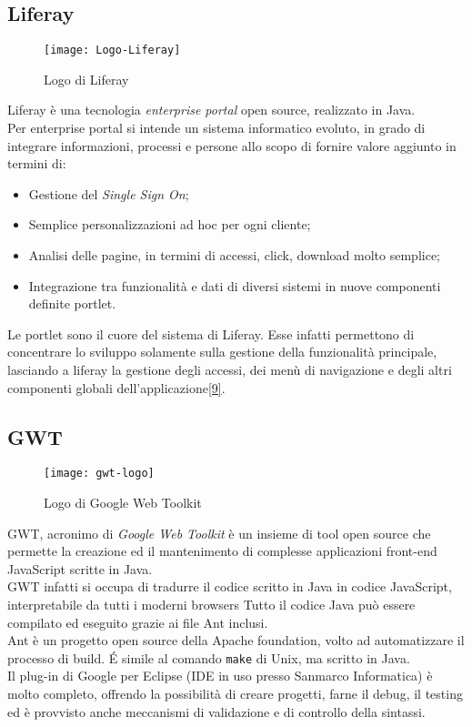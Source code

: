 \subsection{Liferay}
\begin{figure}[h]
	\centering
	\texttt{[image: Logo-Liferay]}
	\caption{Logo di Liferay}
\end{figure}
Liferay è una tecnologia \emph{enterprise portal} open source, realizzato in Java.\\
Per enterprise portal si intende un sistema informatico evoluto, in grado di integrare informazioni, processi e persone allo scopo di fornire valore aggiunto in termini di:
\begin{itemize}
	\item Gestione del \emph{Single Sign On};
	\item Semplice personalizzazioni ad hoc per ogni cliente;
	\item Analisi delle pagine, in termini di accessi, click, download molto semplice;
	\item Integrazione tra funzionalità e dati di diversi sistemi in nuove componenti definite \gls{portlet}\glsfirstoccur. 
\end{itemize}
Le \gls{portlet} sono il cuore del sistema di Liferay. Esse infatti permettono di concentrare lo sviluppo solamente sulla gestione della funzionalità principale, lasciando a liferay la gestione degli accessi, dei menù di navigazione e degli altri componenti globali dell'applicazione\hyperlink{09}{[9]}.\\
\subsection{GWT}
\begin{figure}[h]
	\centering
	\texttt{[image: gwt-logo]}
	\caption{Logo di Google Web Toolkit}
\end{figure} 
GWT, acronimo di \emph{Google Web Toolkit} è un insieme di tool open source che permette la creazione ed il mantenimento di complesse applicazioni front-end JavaScript scritte in Java.\\
GWT infatti si occupa di tradurre il codice scritto in Java in codice JavaScript, interpretabile da tutti i moderni browsers Tutto il codice Java può essere compilato ed eseguito grazie ai file Ant inclusi.\\
Ant è un progetto open source della Apache foundation, volto ad automatizzare il processo di build. \'E simile al comando \lstinline[language=C]|make| di Unix, ma scritto in Java. \\ %
Il plug-in di Google per Eclipse (IDE in uso presso Sanmarco Informatica) è molto completo, offrendo la possibilità di creare progetti, farne il debug, il testing ed è provvisto anche meccanismi di validazione e di controllo della sintassi.\\
